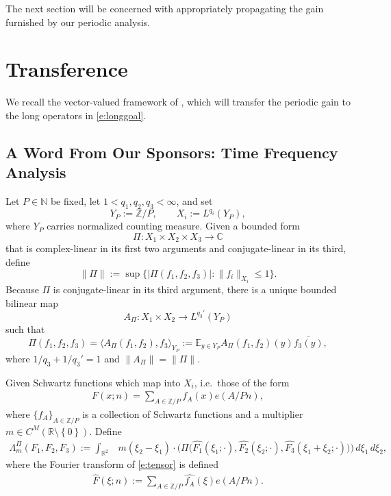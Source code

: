 \documentclass[12pt,leqno]{amsart}
\def\Z {{\mathbb Z}}
\numberwithin{equation}{section}
\theoremstyle{definition}
\theoremstyle{plain}
\begin{document}
	The next section will be concerned with appropriately propagating the gain furnished by our periodic analysis.
	
	\section{Transference}\label{s:transference}
	We recall the vector-valued framework of \cite{AmentaUraltsev2020,DPLMV}, which will transfer the periodic gain to the long operators in \eqref{e:longgoal}.
	\subsection{A Word From Our Sponsors: Time Frequency Analysis}\label{s:TFA} 
	
	Let $P\in\mathbb{N}$ be fixed, let $1<q_1,q_2,q_3<\infty$, and set
	\[
	Y_P:=\mathbb{Z}/P,\qquad X_i:=L^{q_i}(Y_P),
	\]
	where $Y_P$ carries normalized counting measure.
	Given a bounded form
	\[
	\Pi:X_1\times X_2\times X_3\to\mathbb{C}
	\]
	that is complex-linear in its first two arguments and conjugate-linear
	in its third, define
	\[
	\|\Pi\|:=\sup\bigl\{|\Pi(f_1,f_2,f_3)|:
	\|f_i\|_{X_i}\leq1\bigr\}.
	\]
	Because $\Pi$ is conjugate-linear in its third argument, there is a
	unique bounded bilinear map
	\[
	A_\Pi:X_1\times X_2\to L^{q_3'}(Y_P)
	\]
	such that
	\[
	\Pi(f_1,f_2,f_3)
	=\langle A_\Pi(f_1,f_2),f_3\rangle_{Y_P}
	:=\mathbb{E}_{y\in Y_P}A_\Pi(f_1,f_2)(y)\overline{f_3(y)},
	\]
	where $1/q_3+1/q_3'=1$ and $\|A_\Pi\|=\|\Pi\|$.
	
	Given Schwartz functions which map into $X_i$, i.e.\ those of the form
	\begin{align}\label{e:tensor}
		F(x;n) = \sum_{A \in \mathbb{Z}/P} f_{A}(x) e(A/P n), 
	\end{align} where $\{ f_A \}_{A \in \Z/P} $ is a collection of Schwartz functions
	and a multiplier
	$	m \in C^{M}(\mathbb{R}\setminus \left\{0\right\}).$
	Define
	\begin{align}
		\Lambda_m^{\Pi}(F_1,F_2,F_3)
		:=\int_{\mathbb{R}^2} &m(\xi_2-\xi_1)\cdot \Big( \Pi\bigl(\widehat{F_1}(\xi_1;\cdot),
		\widehat{F_2}(\xi_2;\cdot),
		\widehat{F_3}(\xi_1+\xi_2;\cdot)\bigr) \Big)
		\,d\xi_1\,d\xi_2,
	\end{align}
	where the Fourier transform of \eqref{e:tensor} is defined
	\begin{align}
		\widehat{F}(\xi;n) := \sum_{A \in \mathbb{Z}/P} \widehat{f_{A}}(\xi) e(A/P n).
	\end{align}
	
\end{document}
